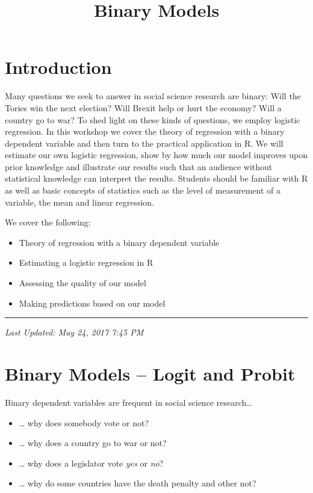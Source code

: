 \documentclass[]{article}
\title{Binary Models}
\author{}
\date{}
\providecommand{\tightlist}{%
  \setlength{\itemsep}{0pt}\setlength{\parskip}{0pt}}
\theoremstyle{definition}
\theoremstyle{definition}
\theoremstyle{remark}
\begin{document}
\maketitle

{
\setcounter{tocdepth}{2}
\tableofcontents
}
\section{Introduction}\label{introduction}

Many questions we seek to answer in social science research are binary:
Will the Tories win the next election? Will Brexit help or hurt the
economy? Will a country go to war? To shed light on these kinds of
questions, we employ logistic regression. In this workshop we cover the
theory of regression with a binary dependent variable and then turn to
the practical application in R. We will estimate our own logistic
regression, show by how much our model improves upon prior knowledge and
illustrate our results such that an audience without statistical
knowledge can interpret the results. Students should be familiar with R
as well as basic concepts of statistics such as the level of measurement
of a variable, the mean and linear regression.

We cover the following:

\begin{itemize}
\tightlist
\item
  Theory of regression with a binary dependent variable
\item
  Estimating a logistic regression in R
\item
  Assessing the quality of our model
\item
  Making predictions based on our model
\end{itemize}

\begin{center}\rule{0.5\linewidth}{\linethickness}\end{center}

\emph{Last Updated: May 24, 2017 7:45 PM}

\section{Binary Models -- Logit and
Probit}\label{binary-models-logit-and-probit}

Binary dependent variables are frequent in social science
research\ldots{}

\begin{itemize}
\tightlist
\item
  \ldots{} why does somebody vote or not?
\item
  \ldots{} why does a country go to war or not?
\item
  \ldots{} why does a legislator vote \emph{yes} or \emph{no}?
\item
  \ldots{} why do some countries have the death penalty and other not?
\end{itemize}
\end{document}
